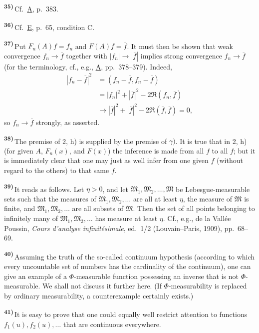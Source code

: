 \documentclass[12pt,b5paper,twoside]{article}
\newcommand{\originalnote}[1]{%
  \par\smallskip\noindent\hypertarget{note:#1}{\textsuperscript{\textbf{#1)}}}\,}
\begin{document}
\originalnote{35}Cf.\ \hyperref[ref:A]{A}, p.~383.

\originalnote{36}Cf.\ \hyperref[ref:E]{E}, p.~65, condition C.

\originalnote{37}Put $F_n(A)f=f_n$ and $F(A)f=\overline{f}$.  It must then be shown
that weak convergence $f_n\to\overline{f}$ together with
$| f_n|\to|\overline{f}|$ implies strong convergence
$f_n\to\overline{f}$ (for the terminology, cf., e.g., \hyperref[ref:A]{A}, pp.~378--379).  Indeed,
\begin{align*}
 | f_n-\overline{f}|^2
 &= (f_n-\overline{f},f_n-\overline{f}) \\
 &= | f_n|^2+|\overline{f}|^2
    -2\Re(f_n,\overline{f}) \\
 &\longrightarrow
 |\overline{f}|^2+|\overline{f}|^2
    -2\Re(\overline{f},\overline{f})=0,
\end{align*}
so $f_n\to\overline{f}$ strongly, as asserted.

\originalnote{38}The premise of 2, h) is supplied by the premise of $\gamma)$.  It is
true that in 2, h) (for given $A$, $F_n(x)$, and $F(x)$) the inference is made from
all $f$ to all $f$; but it is immediately clear that one may just as well infer from
one given $f$ (without regard to the others) to that same $f$.

\originalnote{39}It reads as follows.  Let $\eta>0$, and let
$\mathfrak{M}_1,\mathfrak{M}_2,\ldots,\mathfrak{M}$ be Lebesgue-measurable sets such
that the measures of $\mathfrak{M}_1,\mathfrak{M}_2,\ldots$ are all at least $\eta$,
the measure of $\mathfrak{M}$ is finite, and
$\mathfrak{M}_1,\mathfrak{M}_2,\ldots$ are all subsets of $\mathfrak{M}$.  Then the
set of all points belonging to infinitely many of
$\mathfrak{M}_1,\mathfrak{M}_2,\ldots$ has measure at least $\eta$.  Cf., e.g., de la
Vall\'ee Poussin, \emph{Cours d'analyse infinit\'esimale}, ed.~1/2
(Louvain--Paris, 1909), pp.~68--69.

\originalnote{40}Assuming the truth of the so-called continuum hypothesis (according
to which every uncountable set of numbers has the cardinality of the continuum), one
can give an example
of a $\Phi$-measurable function possessing an inverse that is not
$\Phi$-measurable.  We shall not discuss it further here.  (If
$\Phi$-measurability is replaced by ordinary measurability, a counterexample
certainly exists.)

\originalnote{41}It is easy to prove that one could equally well restrict attention
to functions $f_1(u),f_2(u),\ldots$ that are continuous everywhere.
\end{document}
